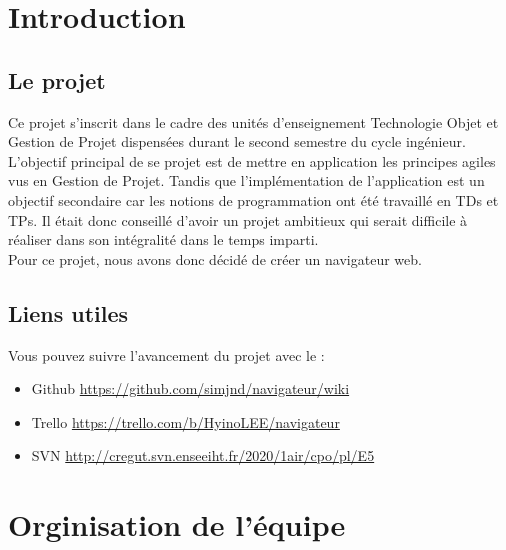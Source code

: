 \documentclass[10pt,a4paper]{article}
\begin{document}
\thispagestyle{empty}


\thispagestyle{empty}
\tableofcontents

\newpage
\setcounter{page}{1}
\section{Introduction}
\subsection{Le projet}
Ce projet s'inscrit dans le cadre des unités d'enseignement Technologie Objet et Gestion de Projet dispensées durant le second semestre du cycle ingénieur. L'objectif principal de se projet est de mettre en application les principes agiles vus en Gestion de Projet. Tandis que l'implémentation de l'application est un objectif secondaire car les notions de programmation ont été travaillé en TDs et TPs. Il était donc conseillé d'avoir un projet ambitieux qui serait difficile à réaliser dans son intégralité dans le temps imparti.\\

Pour ce projet, nous avons donc décidé de créer un navigateur web.

\subsection{Liens utiles}
Vous pouvez suivre l'avancement du projet avec le :
\begin{itemize}
\item Github \href{https://github.com/simjnd/navigateur/wiki}{https://github.com/simjnd/navigateur/wiki}
\item Trello \href{https://trello.com/b/HyinoLEE/navigateur}{https://trello.com/b/HyinoLEE/navigateur} 
\item SVN \href{http://cregut.svn.enseeiht.fr/2020/1air/cpo/pl/E5}{http://cregut.svn.enseeiht.fr/2020/1air/cpo/pl/E5}
\end{itemize}

\newpage

\section{Orginisation de l'équipe}
\end{document}
